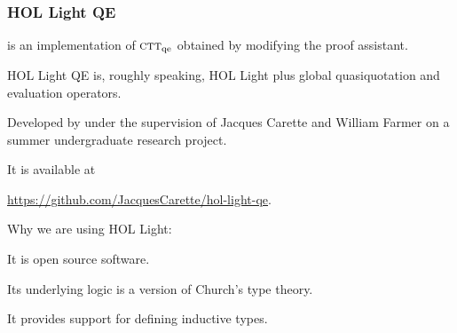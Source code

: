 \documentclass[t,12pt,numbers,fleqn]{beamer}
\newcommand{\churchqe}{$\mbox{\sc ctt}_{\rm qe}$}
\begin{document}
\begin{frame}
\frametitle{HOL Light QE}
\bi

  \item {} is an implementation of {\churchqe}
    obtained by modifying the  proof assistant.

  \bi

    \item HOL Light QE is, roughly speaking, HOL Light plus global
      quasiquotation and evaluation operators.

    \item Developed by  under the
      supervision of Jacques Carette and William Farmer on a summer
      undergraduate research project.

    \item It is available at

    \bi

      \item[] \href{https://github.com/JacquesCarette/hol-light-qe}
        {https://github.com/JacquesCarette/hol-light-qe}.

    \ei

  \ei

  \item Why we are using HOL Light:

  \be

    \item It is open source software.

    \item Its underlying logic is a version of Church's type theory.

    \item It provides support for defining inductive types.

  \ee

\ei
\end{frame}

\end{document}
